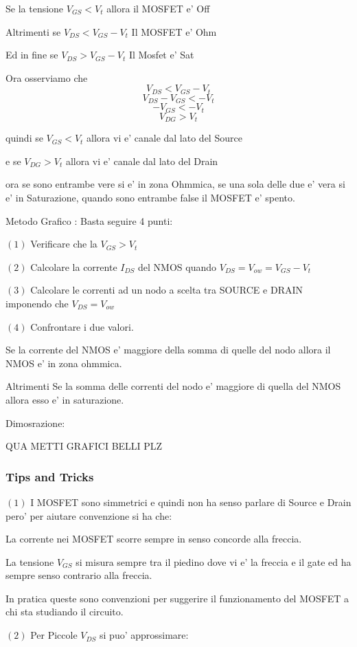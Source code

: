 \documentclass[\main/main.tex]{subfiles}
\begin{document}
Se la tensione $V_{GS} < V_t$ allora il MOSFET e' Off

Altrimenti se  $V_{DS} < V_{GS} - V_t$ Il MOSFET e' Ohm

Ed in fine se  $V_{DS} > V_{GS} - V_t$ Il Mosfet e' Sat

Ora osserviamo che
\[V_{DS} < V_{GS} - V_t\]
\[V_{DS} - V_{GS} <  - V_t\]
\[-V_{GS} <  - V_t\]
\[V_{DG} > V_t\]

quindi se $V_{GS} < V_t$ allora vi e' canale dal lato del Source

e se $V_{DG} > V_t$ allora vi e' canale dal lato del Drain

ora se sono entrambe vere si e' in zona Ohmmica, se una sola delle due e' vera si e' in Saturazione, quando sono entrambe false il MOSFET e' spento.


Metodo Grafico :
Basta seguire 4 punti:

$(1)$ Verificare che la $V_{GS} > V_t$

$(2)$ Calcolare la corrente $I_{DS}$ del NMOS quando $V_{DS} = V_{ow} = V_{GS} - V_{t}$

$(3)$ Calcolare le correnti ad un nodo a scelta tra SOURCE e DRAIN imponendo che $V_{DS} = V_{ow}$

$(4)$ Confrontare i due valori.

Se la corrente del NMOS e' maggiore della somma di quelle del nodo allora il NMOS e' in zona ohmmica.

Altrimenti Se la somma delle correnti del nodo e' maggiore di quella del NMOS allora esso e' in saturazione.

Dimosrazione:

QUA METTI GRAFICI BELLI PLZ

\subsubsection{Tips and Tricks}
$(1)$ I MOSFET sono simmetrici e quindi non ha senso parlare di Source e Drain pero' per aiutare convenzione si ha che:

La corrente nei MOSFET scorre sempre in senso concorde alla freccia.

La tensione $V_{GS}$ si misura sempre tra il piedino dove vi e' la freccia e il gate ed ha sempre senso contrario alla freccia.

In pratica queste sono convenzioni per suggerire il funzionamento del MOSFET a chi sta studiando il circuito.

$(2)$ Per Piccole $V_{DS}$ si puo' approssimare:
\end{document}
